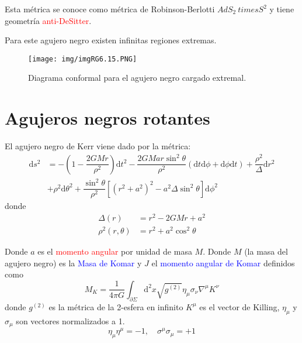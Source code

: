 \documentclass[../main]{subfiles}
\begin{document}
\begin{adjustwidth}{0pt}{-100pt}
Esta métrica se conoce como métrica de Robinson-Berlotti $AdS_2 \ times S^2$ y tiene geometría \textcolor{red}{anti-DeSitter}.

Para este agujero negro existen infinitas regiones extremas.
\begin{figure}[H]
    \begin{adjustwidth}{0pt}{-100pt}
    \centering
    \texttt{[image: img/imgRG6.15.PNG]}
    \caption{Diagrama conformal para el agujero negro cargado extremal.}
    \end{adjustwidth}
\end{figure}

\section{Agujeros negros rotantes}\label{part6.5}

El agujero negro de Kerr viene dado por la métrica:
\begin{equation}
    \begin{split}
        \mathrm{d}s^2&=-\left(1-\dfrac{2GMr}{\rho^2}\right)\mathrm{d}t^2-\dfrac{2GMar\sin^2 \theta}{\rho^2}(\mathrm{d}t\mathrm{d}\phi+\mathrm{d}\phi\mathrm{d}t)+\dfrac{\rho^2}{\Delta}\mathrm{d}r^2\\
        &+\rho^2 \mathrm{d}\theta^2+\dfrac{\sin^2 \theta}{\rho^2}\left[(r^2+a^2)^2-a^2\Delta \sin^2 \theta\right]\mathrm{d}\phi^2
    \end{split}
\end{equation}
donde 
\begin{align}
    \Delta(r)&=r^2-2GMr+a^2\\
    \rho^2(r, \theta)&=r^2+a^2\cos^2 \theta
\end{align}

Donde $a$ es el \textcolor{red}{momento angular} por unidad de masa $M$. Donde $M$ (la masa del agujero negro) es la \textcolor{blue}{Masa de Komar} y $J$ el \textcolor{blue}{momento angular de Komar} definidos como 
\begin{equation}
    M_K=\dfrac{1}{4\pi G}\int_{\partial \Sigma}\mathrm{d}^2 x \sqrt{g^{(2)}} \eta_{\mu} \sigma_{\nu} \nabla^{\mu}K^{\nu}
\end{equation}
donde $g^{(2)}$ es la métrica de la 2-esfera en infinito $K^{\mu}$ es el vector de Killing, $\eta_{\mu}$ y $\sigma_{\mu}$ son vectores normalizados a 1.
\begin{equation}
    \eta_{\mu}\eta^{\mu}=-1,\quad \sigma^{\mu}\sigma_{\mu}=+1
\end{equation}


\end{adjustwidth}
\end{document}
